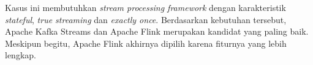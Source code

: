 Kasus ini membutuhkan \textit{stream processing framework} dengan karakteristik \textit{stateful}, \textit{true streaming} dan \textit{exactly once}. Berdasarkan kebutuhan tersebut, Apache Kafka Streams dan Apache Flink merupakan kandidat yang paling baik. Meskipun begitu, Apache Flink akhirnya dipilih karena fiturnya yang lebih lengkap.